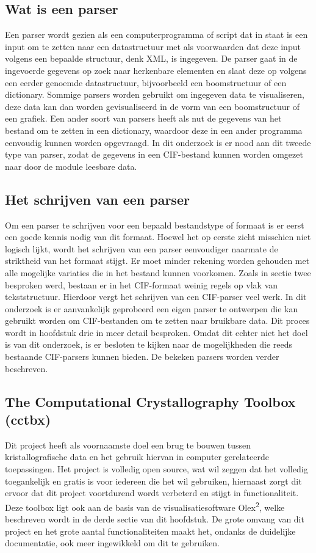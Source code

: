 \subsection{Wat is een parser}
Een parser wordt gezien als een computerprogramma of script dat in staat is een input om te zetten naar een datastructuur met als voorwaarden dat deze input volgens een bepaalde structuur, denk XML, is ingegeven. De parser gaat in de ingevoerde gegevens op zoek naar herkenbare elementen en slaat deze op volgens een eerder genoemde datastructuur, bijvoorbeeld een boomstructuur of een dictionary. Sommige parsers worden gebruikt om ingegeven data te visualiseren, deze data kan dan worden gevisualiseerd in de vorm van een boomstructuur of een grafiek. Een ander soort van parsers heeft als nut de gegevens van het bestand om te zetten in een dictionary, waardoor deze in een ander programma eenvoudig kunnen worden opgevraagd. In dit onderzoek is er nood aan dit tweede type van parser, zodat de gegevens in een CIF-bestand kunnen worden omgezet naar door de module leesbare data. 

\par
\subsection{Het schrijven van een parser}
Om een parser te schrijven voor een bepaald bestandstype of formaat is er eerst een goede kennis nodig van dit formaat. Hoewel het op eerste zicht misschien niet logisch lijkt, wordt het schrijven van een parser eenvoudiger naarmate de striktheid van het formaat stijgt. Er moet minder rekening worden gehouden met alle mogelijke variaties die in het bestand kunnen voorkomen. Zoals in sectie twee besproken werd, bestaan er in het CIF-formaat weinig regels op vlak van tekststructuur. Hierdoor vergt het schrijven van een CIF-parser veel werk. In dit onderzoek is er aanvankelijk geprobeerd een eigen parser te ontwerpen die kan gebruikt worden om CIF-bestanden om te zetten naar bruikbare data. Dit proces wordt in hoofdstuk drie in meer detail besproken. Omdat dit echter niet het doel is van dit onderzoek, is er besloten te kijken naar de mogelijkheden die reeds bestaande CIF-parsers kunnen bieden. De bekeken parsers worden verder beschreven.  

\par
\subsection{The Computational Crystallography Toolbox (cctbx)}
Dit project heeft als voornaamste doel een brug te bouwen tussen kristallografische data en het gebruik hiervan in computer gerelateerde toepassingen. Het project is volledig open source, wat wil zeggen dat het volledig toegankelijk en gratis is voor iedereen die het wil gebruiken, hiernaast zorgt dit ervoor dat dit project voortdurend wordt verbeterd en stijgt in functionaliteit. Deze toolbox ligt ook aan de basis van de visualisatiesoftware Olex\textsuperscript{2}, welke beschreven wordt in de derde sectie van dit hoofdstuk. De grote omvang van dit project en het grote aantal functionaliteiten maakt het, ondanks de duidelijke documentatie, ook meer ingewikkeld om dit te gebruiken. 

